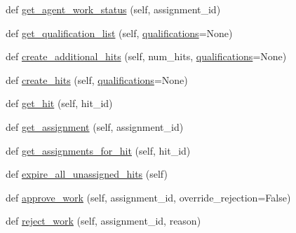 \begin{DoxyCompactItemize}
\item 
def \hyperlink{classparlai_1_1mturk_1_1core_1_1legacy__2018_1_1mturk__manager_1_1MTurkManager_abcefa69505b7479b015a55646938dd81}{get\+\_\+agent\+\_\+work\+\_\+status} (self, assignment\+\_\+id)
\item 
def \hyperlink{classparlai_1_1mturk_1_1core_1_1legacy__2018_1_1mturk__manager_1_1MTurkManager_a578e8cd82696d6646b869fb0b6228928}{get\+\_\+qualification\+\_\+list} (self, \hyperlink{classparlai_1_1mturk_1_1core_1_1legacy__2018_1_1mturk__manager_1_1MTurkManager_ab7e72289f4c8dc66fe67aec8e3027688}{qualifications}=None)
\item 
def \hyperlink{classparlai_1_1mturk_1_1core_1_1legacy__2018_1_1mturk__manager_1_1MTurkManager_a8dcdae632395f22e310a4225aadde500}{create\+\_\+additional\+\_\+hits} (self, num\+\_\+hits, \hyperlink{classparlai_1_1mturk_1_1core_1_1legacy__2018_1_1mturk__manager_1_1MTurkManager_ab7e72289f4c8dc66fe67aec8e3027688}{qualifications}=None)
\item 
def \hyperlink{classparlai_1_1mturk_1_1core_1_1legacy__2018_1_1mturk__manager_1_1MTurkManager_a01873b0b39427a6762cbe444b87fbf4b}{create\+\_\+hits} (self, \hyperlink{classparlai_1_1mturk_1_1core_1_1legacy__2018_1_1mturk__manager_1_1MTurkManager_ab7e72289f4c8dc66fe67aec8e3027688}{qualifications}=None)
\item 
def \hyperlink{classparlai_1_1mturk_1_1core_1_1legacy__2018_1_1mturk__manager_1_1MTurkManager_a80f543fcc851ae559618928d0cdc1546}{get\+\_\+hit} (self, hit\+\_\+id)
\item 
def \hyperlink{classparlai_1_1mturk_1_1core_1_1legacy__2018_1_1mturk__manager_1_1MTurkManager_a256bbe1f481fd2df27e38ce55378a030}{get\+\_\+assignment} (self, assignment\+\_\+id)
\item 
def \hyperlink{classparlai_1_1mturk_1_1core_1_1legacy__2018_1_1mturk__manager_1_1MTurkManager_a93ac872c0b8f85f39710910aa54eec4b}{get\+\_\+assignments\+\_\+for\+\_\+hit} (self, hit\+\_\+id)
\item 
def \hyperlink{classparlai_1_1mturk_1_1core_1_1legacy__2018_1_1mturk__manager_1_1MTurkManager_abfb1066860d209e5fee4a15b30cc88a6}{expire\+\_\+all\+\_\+unassigned\+\_\+hits} (self)
\item 
def \hyperlink{classparlai_1_1mturk_1_1core_1_1legacy__2018_1_1mturk__manager_1_1MTurkManager_a3b905755ae6905ca640e831ce95c6e85}{approve\+\_\+work} (self, assignment\+\_\+id, override\+\_\+rejection=False)
\item 
def \hyperlink{classparlai_1_1mturk_1_1core_1_1legacy__2018_1_1mturk__manager_1_1MTurkManager_a48dc4a43d5ad927bac268686a2c58aca}{reject\+\_\+work} (self, assignment\+\_\+id, reason)

\end{DoxyCompactItemize}
